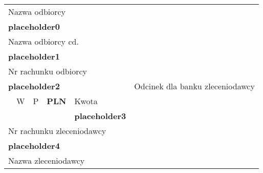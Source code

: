 \documentclass{article}
\begin{document}
\begin{table}[h]
{\setlength{\tabcolsep}{0.5em}
\begin{tabularx}{\textwidth}{|Xccll|c|}
\hline
\multicolumn{5}{|l|}{Nazwa odbiorcy}                                                                                    & \multirow{22}{*}{ \begin{sideways}Odcinek dla banku zleceniodawcy\end{sideways}} \\
\multicolumn{5}{|l|}{\textbf{placeholder0}}                                                                                                  &                                             \\
\multicolumn{5}{|l|}{Nazwa odbiorcy cd.}                                                                                &                                             \\
\multicolumn{5}{|l|}{\textbf{placeholder1}}                                                                                                  &                                             \\ \cline{1-5}
\multicolumn{5}{|l|}{Nr rachunku odbiorcy}                                                                              &                                             \\
\multicolumn{5}{|l|}{\textbf{placeholder2}}                                                                                                  &                                             \\ \cline{2-3} \cline{5-5}
 & \multicolumn{1}{|l|}{W}      & \multicolumn{1}{l|}{P}      & \multicolumn{1}{X|}{\centering \textbf{PLN}}      & Kwota                    &                                             \\ \cline{2-3}
&                             &                             & \multicolumn{1}{l|}{}                  &  \textbf{placeholder3}                &                                             \\ \cline{1-5}
\multicolumn{5}{|l|}{Nr rachunku zleceniodawcy}                                                                         &                                             \\
\multicolumn{5}{|l|}{\textbf{placeholder4}}                                                                                                  &                                             \\
\multicolumn{5}{|l|}{Nazwa zleceniodawcy}                                                                               &                                             \\

\end{tabularx}}
\end{table}
\end{document}
